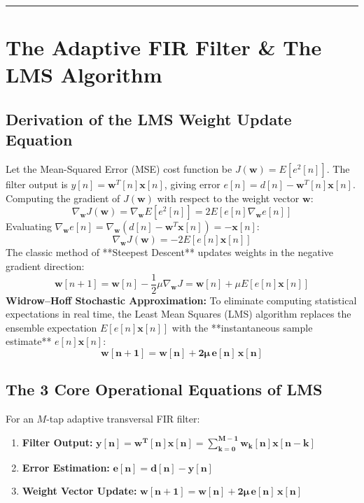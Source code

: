 \documentclass[11pt,a4paper]{article}
\begin{document}
\noindent\rule{\textwidth}{0.5pt}

\section{The Adaptive FIR Filter \& The LMS Algorithm}

\subsection{Derivation of the LMS Weight Update Equation}
Let the Mean-Squared Error (MSE) cost function be $J(\mathbf{w}) = E[e^2[n]]$. The filter output is $y[n] = \mathbf{w}^T[n] \mathbf{x}[n]$, giving error $e[n] = d[n] - \mathbf{w}^T[n] \mathbf{x}[n]$.
Computing the gradient of $J(\mathbf{w})$ with respect to the weight vector $\mathbf{w}$:
\begin{equation}
\nabla_{\mathbf{w}} J(\mathbf{w}) = \nabla_{\mathbf{w}} E[e^2[n]] = 2 E\left[ e[n] \nabla_{\mathbf{w}} e[n] \right]
\end{equation}
Evaluating $\nabla_{\mathbf{w}} e[n] = \nabla_{\mathbf{w}} \left( d[n] - \mathbf{w}^T \mathbf{x}[n] \right) = -\mathbf{x}[n]$:
\begin{equation}
\nabla_{\mathbf{w}} J(\mathbf{w}) = -2 E\left[ e[n] \mathbf{x}[n] \right]
\end{equation}
The classic method of **Steepest Descent** updates weights in the negative gradient direction:
\begin{equation}
\mathbf{w}[n+1] = \mathbf{w}[n] - \frac{1}{2} \mu \nabla_{\mathbf{w}} J = \mathbf{w}[n] + \mu E[e[n] \mathbf{x}[n]]
\end{equation}
\textbf{Widrow--Hoff Stochastic Approximation:} To eliminate computing statistical expectations in real time, the Least Mean Squares (LMS) algorithm replaces the ensemble expectation $E[e[n]\mathbf{x}[n]]$ with the **instantaneous sample estimate** $e[n]\mathbf{x}[n]$:
\begin{equation}
\mathbf{\mathbf{w}[n+1] = \mathbf{w}[n] + 2\mu \, e[n] \, \mathbf{x}[n]}
\end{equation}

\subsection{The 3 Core Operational Equations of LMS}
For an $M$-tap adaptive transversal FIR filter:
\begin{enumerate}
    \item \textbf{Filter Output:} $\mathbf{y[n] = \mathbf{w}^T[n] \mathbf{x}[n] = \sum_{k=0}^{M-1} w_k[n] x[n-k]}$
    \item \textbf{Error Estimation:} $\mathbf{e[n] = d[n] - y[n]}$
    \item \textbf{Weight Vector Update:} $\mathbf{\mathbf{w}[n+1] = \mathbf{w}[n] + 2\mu \, e[n] \, \mathbf{x}[n]}$
\end{enumerate}
\end{document}
